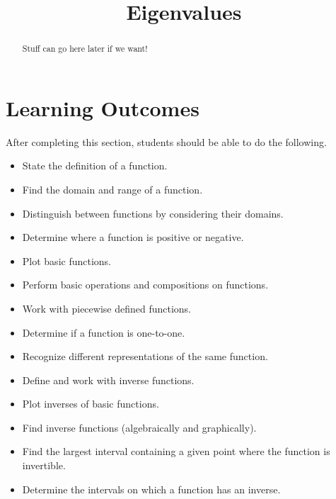 \documentclass{ximera}
\title{Eigenvalues}
\begin{document}
\begin{abstract}
Stuff can go here later if we want!
\end{abstract}
 
\maketitle
 
\section*{Learning Outcomes}
After completing this section, students should be able to do the following.
 
\begin{itemize}
    \item State the definition of a function.
    \item Find the domain and range of a function.
    \item Distinguish between functions by considering their domains.
    \item Determine where a function is positive or negative.
    \item Plot basic functions.
        \item Perform basic operations and compositions on
          functions.
        \item Work with piecewise defined functions.
    \item Determine if a function is one-to-one.
    \item Recognize different representations of the same function.
        \item Define and work with inverse functions.
        \item Plot inverses of basic functions.
    \item Find inverse functions (algebraically and graphically).
        \item Find the largest interval containing a given point
          where the function is invertible.
    \item Determine the intervals on which a function has an inverse.
 
\end{itemize}

 
\end{document}
